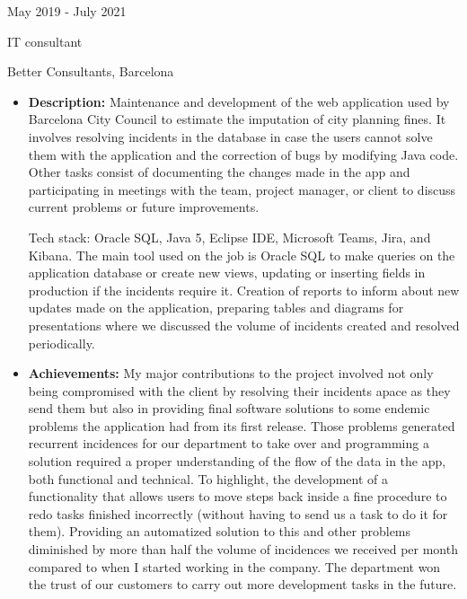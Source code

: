 \documentclass[a4paper,10pt]{article}
\newlength{\cvcolumngapwidth}
\newlength{\cvleftcolumnwidth}
\newlength{\cvrightcolumnwidth}
\newcommand{\cvtitlestyle}[1]{{\large\cvtitlefont\textcolor{cvtitlecolor}{#1}}}
\newcommand{\cvdurationstyle}[1]{{\small\cvdurationfont\textcolor{cvdurationcolor}{#1}}}
\newlength{\cvafteritemskipamount}
\newlength{\cvaftertitleskipamount}
\newlength{\cvparskip}
\newcommand{\cvitem}[2]{
    \begin{minipage}[t]{\cvleftcolumnwidth}
        \raggedleft #1
    \end{minipage}%
    \hspace{\cvcolumngapwidth}%
    \begin{minipage}[t]{\cvrightcolumnwidth}
        \setlength{\parskip}{\cvparskip} #2
    \end{minipage}

    \vspace{\cvafteritemskipamount}
}
\newcommand{\cvtitle}[1]{
    \cvtitlestyle{#1}

    \vspace{\cvaftertitleskipamount}
    \vspace{-\cvparskip}
}
\begin{document}
\cvitem{
    \cvdurationstyle{May 2019 - July 2021}
}{
    \cvtitle{IT consultant}
    
    Better Consultants, Barcelona 
    \vspace{5pt}
    \begin{itemize}[leftmargin=*]
        \item \textbf{Description:} Maintenance and development of the web application used by Barcelona City Council to estimate the imputation of city planning fines. It involves resolving incidents in the database in case the users cannot solve them with the application and the correction of bugs by modifying Java code. Other tasks consist of documenting the changes made in the app and participating in meetings with the team, project manager, or client to discuss current problems or future improvements.\newline

        Tech stack: Oracle SQL, Java 5, Eclipse IDE, Microsoft Teams, Jira, and Kibana. The main tool used on the job is Oracle SQL to make queries on the application database or create new views, updating or inserting fields in production if the incidents require it. Creation of reports to inform about new updates made on the application, preparing tables and diagrams for presentations where we discussed the volume of incidents created and resolved periodically.
        \vspace{5pt}
        \item \textbf{Achievements:} My major contributions to the project involved not only being compromised with the client by resolving their incidents apace as they send them but also in providing final software solutions to some endemic problems the application had from its first release. Those problems generated recurrent incidences for our department to take over and programming a solution required a proper understanding of the flow of the data in the app, both functional and technical. To highlight, the development of a functionality that allows users to move steps back inside a fine procedure to redo tasks finished incorrectly (without having to send us a task to do it for them). %
        Providing an automatized solution to this and other problems diminished by more than half the volume of incidences we received per month compared to when I started working in the company. The department won the trust of our customers to carry out more development tasks in the future.
    \end{itemize}
}
\end{document}
